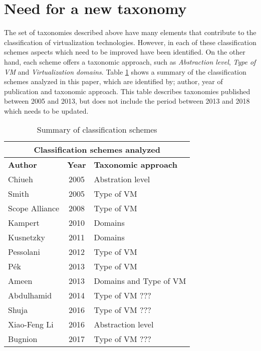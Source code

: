 	\section {Need for a new taxonomy}\label{sec:necesidadDeUnaTaxonomia}
	
	The set of taxonomies described above have many elements that contribute to the classification of virtualization technologies. However, in each of these classification schemes aspects which need to be improved have been identified. On the other hand, each scheme offers a taxonomic approach, such as \textit{Abstraction level}, \textit{Type of VM} and \textit{Virtualization domains}. Table \ref{cuadro:resumenTrabajos} shows a summary of the classification schemes analyzed in this paper, which are identified by; author, year of publication and taxonomic approach. This table describes taxonomies published between 2005 and 2013, but does not include the period between 2013 and 2018 which needs to be updated.
	
	
	\begin{table}[H]
		\centering
		\begin{tabular}{|l|c|l|}
			\hline
			\multicolumn{3}{|c|}{\textbf{Classification schemes analyzed}}\\
			\hline
			\textbf{Author} & \textbf{Year} & \textbf{Taxonomic approach} \\ 
			\hline
			Chiueh          & 2005          & Abstration level\\ 
			\hline
			Smith           & 2005          & Type of VM\\ 
			\hline
			Scope Alliance  & 2008          & Type of VM\\ 
			\hline
			Kampert         & 2010          & Domains\\ 
			\hline
			Kusnetzky       & 2011          & Domains\\ 
			\hline
			Pessolani       & 2012          & Type of VM\\ 
			\hline
			P{\'e}k         & 2013          & Type of VM\\ 
			\hline
			Ameen           & 2013          & Domains and Type of VM\\ 
			\hline
			Abdulhamid      & 2014          & Type of VM ???\\ 
			\hline
			Shuja           & 2016          & Type of VM ???\\ 
			\hline
			Xiao-Feng Li    & 2016          & Abstraction level\\ 
			\hline
			Bugnion         & 2017          & Type of VM ???\\ 
			\hline
		\end{tabular}
		\caption{Summary of classification schemes}
		\label{cuadro:resumenTrabajos}
		
	\end{table}

